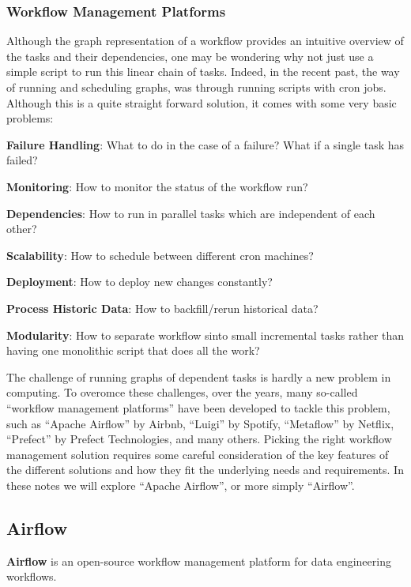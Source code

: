 \subsubsection{Workflow Management Platforms}

Although the graph representation of a workflow provides an intuitive overview of the tasks and their dependencies,
one may be wondering why not just use a simple script to run this linear chain of tasks. Indeed, in the recent past,
the way of running and scheduling graphs, was through running scripts with cron jobs. Although this is a quite
straight forward solution, it comes with some very basic problems:
\bit
\item \textbf{Failure Handling}: What to do in the case of a failure? What if a single task has failed?
\item \textbf{Monitoring}: How to monitor the status of the workflow run?
\item \textbf{Dependencies}: How to run in parallel tasks which are independent of each other?
\item \textbf{Scalability}: How to schedule between different cron machines?
\item \textbf{Deployment}: How to deploy new changes constantly?
\item \textbf{Process Historic Data}: How to backfill/rerun historical data?
\item \textbf{Modularity}: How to separate workflow sinto small incremental tasks rather than having one monolithic
script that does all the work?
\eit

The challenge of running graphs of dependent tasks is hardly a new problem in computing. To overomce these challenges,
over the years, many so-called ``workflow management platforms'' have been developed to tackle this problem, such as
``Apache Airflow'' by Airbnb, ``Luigi'' by Spotify, ``Metaflow'' by Netflix, ``Prefect'' by Prefect Technologies, and
many others. Picking the right workflow management solution requires some careful consideration of the key features of
the different solutions and how they fit the underlying needs and requirements. In these notes we will explore ``Apache
Airflow'', or more simply ``Airflow''.

\subsection{Airflow}

\bd[Airflow]
\textbf{Airflow} is an open-source workflow management platform for data engineering workflows.
\ed

